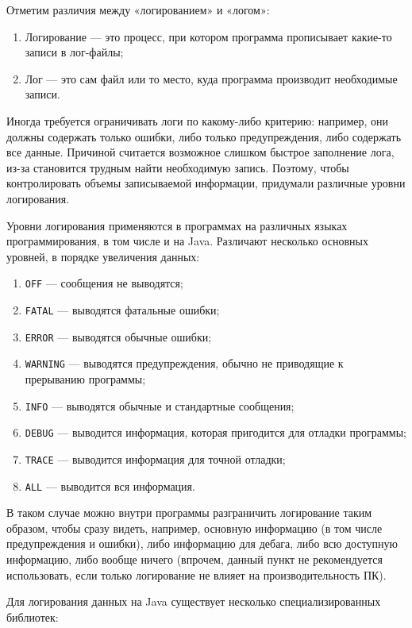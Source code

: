 Отметим различия между «логированием» и «логом»:

\begin{enumerate}
    \item Логирование — это процесс, при котором программа прописывает какие-то записи в лог-файлы;
    \item Лог — это сам файл или то место, куда программа производит необходимые записи.
\end{enumerate}

Иногда требуется ограничивать логи по какому-либо критерию: например, они должны содержать только ошибки, либо  только предупреждения, либо содержать все данные. Причиной считается возможное слишком быстрое заполнение лога, из-за становится трудным найти необходимую запись. Поэтому, чтобы контролировать объемы записываемой информации, придумали различные уровни логирования.

Уровни логирования применяются в программах на различных языках программирования, в том числе и на Java. Различают несколько основных уровней, в порядке увеличения данных:

\begin{enumerate}
    \item \verb|OFF| — сообщения не выводятся;
    \item \verb|FATAL| — выводятся фатальные ошибки;
    \item \verb|ERROR| — выводятся обычные ошибки;
    \item \verb|WARNING| — выводятся предупреждения, обычно не приводящие к прерыванию программы;
    \item \verb|INFO| — выводятся обычные и стандартные сообщения;
    \item \verb|DEBUG| — выводится информация, которая пригодится для отладки программы;
    \item \verb|TRACE| — выводится информация для точной отладки;
    \item \verb|ALL| — выводится вся информация.
\end{enumerate}

В таком случае можно внутри программы разграничить логирование таким образом, чтобы сразу видеть, например, основную информацию (в том числе предупреждения и ошибки), либо информацию для дебага, либо всю доступную информацию, либо вообще ничего (впрочем, данный пункт не рекомендуется использовать, если только логирование не влияет на производительность ПК).

Для логирования данных на Java существует несколько специализированных библиотек:

